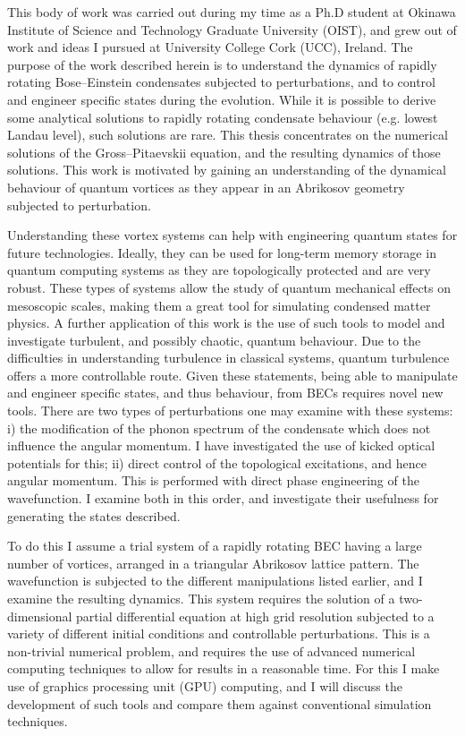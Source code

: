 
This body of work was carried out during my time as a Ph.D student at Okinawa Institute of Science and Technology Graduate University (OIST), and grew out of work and ideas I pursued at University College Cork (UCC), Ireland. The purpose of the work described herein is to understand the dynamics of rapidly rotating Bose--Einstein condensates subjected to perturbations, and to control and engineer specific states during the evolution. While it is possible to derive some analytical solutions to rapidly rotating condensate behaviour (e.g. lowest Landau level), such solutions are rare. This thesis concentrates on the numerical solutions of the Gross--Pitaevskii equation, and the resulting dynamics of those solutions. This work is motivated by gaining an understanding of the dynamical behaviour of quantum vortices as they appear in an Abrikosov geometry subjected to perturbation. %

Understanding these vortex systems can help with engineering quantum states for future technologies. Ideally, they can be used for long-term memory storage in quantum computing systems as they are topologically protected and are very robust. These types of systems allow the study of quantum mechanical effects on mesoscopic scales, making them a great tool for simulating condensed matter physics. A further application of this work is the use of such tools to model and investigate turbulent, and possibly chaotic, quantum behaviour. Due to the difficulties in understanding turbulence in classical systems, quantum turbulence offers a more controllable route. Given these statements, being able to manipulate and engineer specific states, and thus behaviour, from BECs requires novel new tools. There are two types of perturbations one may examine with these systems: i) the modification of the phonon spectrum of the condensate which does not influence the angular momentum. I have investigated the use of kicked optical potentials for this; ii) direct control of the topological excitations, and hence angular momentum. This is performed with direct phase engineering of the wavefunction. I examine both in this order, and investigate their usefulness for generating the states described.

To do this I assume a trial system of a rapidly rotating BEC having a large number of vortices, arranged in a triangular Abrikosov lattice pattern. The wavefunction is subjected to the different manipulations listed earlier, and I examine the resulting dynamics. This system requires the solution of a two-dimensional partial differential equation at high grid resolution subjected to a variety of different initial conditions and controllable perturbations. This is a non-trivial numerical problem, and requires the use of advanced numerical computing techniques to allow for results in a reasonable time. For this I make use of graphics processing unit (GPU) computing, and I will discuss the development of such tools and compare them against conventional simulation techniques.

